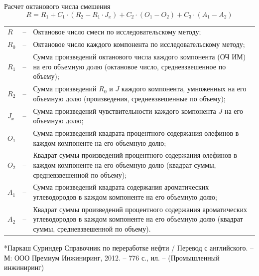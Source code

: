 \documentclass[aspectratio=169, mathserif]{beamer}%
\begin{document}
\begin{frame}[fragile, label=c]{Расчет октанового числа смешения}
\scriptsize
\begin{equation}
	R = R_1 + C_1 \cdot \left(R_2 - R_1 \cdot J_x\right) + C_2 \cdot \left(O_1 - O_2\right) + C_3 \cdot \left(A_1 - A_2\right)
\end{equation}
\vfill
\begin{tabular}{p{}p{}p{}}
$R$ & -- & Октановое число смеси по исследовательскому методу; \\
$R_0$ & -- & Октановое число каждого компонента по исследовательскому методу; \\
$R_1$ & -- & Сумма произведений октанового числа каждого компонента (ОЧ ИМ) на его объемную долю (октановое число, средневзвешенное по объему); \\
$R_2$ & -- & Сумма произведений $R_0$ и $J$ каждого компонента, умноженных на его объемную долю (произведения, средневзвешенные по объему); \\
$J_x$ & -- & Сумма произведений чувствительности каждого компонента $J$ на его объемную долю; \\
$O_1$ & -- & Сумма произведений квадрата процентного содержания олефинов в каждом компоненте на его объемную долю; \\
$O_2$ & -- & Квадрат суммы произведений процентного содержания олефинов в каждом компоненте на его объемную долю (квадрат суммы, средневзвешенной по объему); \\
$A_1$ & -- & Сумма произведений квадрата содержания ароматических углеводородов в каждом компоненте на его объемную долю; \\
$A_2$ & -- & Квадрат суммы произведений процентного содержания ароматических углеводородов в каждом компоненте на его объемную долю (квадрат суммы, средневзвешенной по объему). \\
\end{tabular}
\vfill
\tiny{*Паркаш Суриндер Справочник по переработке нефти / Перевод с английского. – М: ООО Премиум Инжиниринг, 2012. – 776 с., ил. – (Промышленный инжиниринг)}
\vfill
\end{frame}
\end{document}
